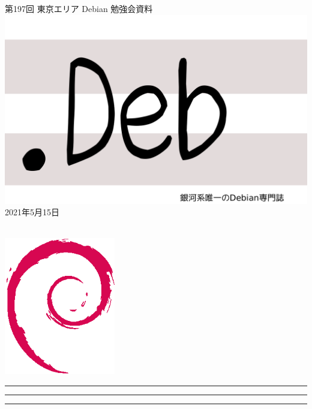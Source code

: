 \documentclass[mingoth,a4paper]{jsarticle}
\newcommand{\debmtgyear}{2021}
\newcommand{\debmtgmonth}{5}
\newcommand{\debmtgdate}{15}
\newcommand{\debmtgnumber}{197}
\begin{document}
\begin{titlepage}
\thispagestyle{empty}

\vspace*{-2cm}
第\debmtgnumber{}回 東京エリア Debian 勉強会資料\\
\hspace*{-2cm}
\includegraphics{image-assets/dotdeb.pdf}\\
\hfill{}\debmtgyear{}年\debmtgmonth{}月\debmtgdate{}日

\\

\vspace*{-2cm}
\hfill{}\includegraphics[height=6cm]{image-assets/openlogo-nd.eps}
\end{titlepage}

\newpage

\begin{minipage}[b]{0.2\hsize}
 \colorbox{titleback}{}
\end{minipage}
\begin{minipage}[b]{0.8\hsize}
\hrule
\vspace{2mm}
\hrule
\begin{multicols}{2}
\tableofcontents
\end{multicols}
\vspace{2mm}
\hrule
\end{minipage}
\end{document}
